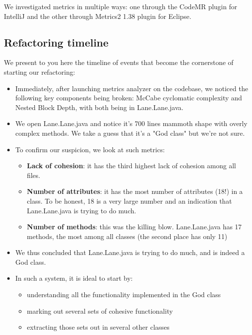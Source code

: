 We investigated metrics in multiple ways: one through the CodeMR plugin for IntelliJ and the other through Metrics2 1.38 plugin for Eclipse.

\subsection{Refactoring timeline}

We present to you here the timeline of events that become the cornerstone of starting our refactoring:

\begin{itemize}

    \item Immediately, after launching metrics analyzer on the codebase, we noticed the following key components being broken: McCabe cyclomatic complexity and Nested Block Depth, with both being in Lane.Lane.java.
    \item We open Lane.Lane.java and notice it's 700 lines mammoth shape with overly complex methods. We take a guess that it's a "God class" but we're not sure.
    \item To confirm our suspicion, we look at such metrics:

          \begin{itemize}
              \item \textbf{Lack of cohesion}: it has the third highest lack of cohesion among all files.
              \item \textbf{Number of attributes}: it has the most number of attributes (18!) in a class. To be honest, 18 is a very large number and an indication that Lane.Lane.java is trying to do much.
              \item \textbf{Number of methods}: this was the killing blow. Lane.Lane.java has 17 methods, the most among all classes (the second place has only 11)
          \end{itemize}

    \item We thus concluded that Lane.Lane.java is trying to do much, and is indeed a God class.
    \item In such a system, it is ideal to start by:
          \begin{itemize}
              \item understanding all the functionality implemented in the God class
              \item marking out several sets of cohesive functionality
              \item extracting those sets out in several other classes
          \end{itemize}


\end{itemize}
